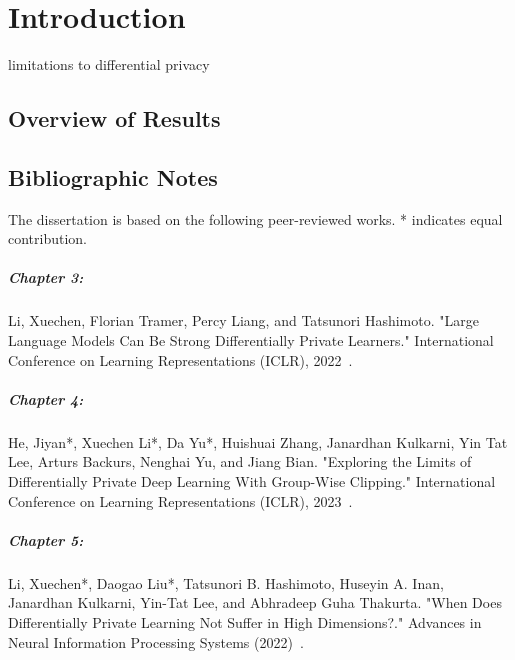 \chapter{Introduction}


limitations to differential privacy

\section{Overview of Results}


\newpage
\section*{Bibliographic Notes}

The dissertation is based on the following peer-reviewed works.
* indicates equal contribution.

\paragraph{Chapter 3:} 
Li, Xuechen, Florian Tramer, Percy Liang, and Tatsunori Hashimoto. "Large Language Models Can Be Strong Differentially Private Learners." International Conference on Learning Representations (ICLR), 2022~\cite{li2021large}.

\paragraph{Chapter 4:}
He, Jiyan*, Xuechen Li*, Da Yu*, Huishuai Zhang, Janardhan Kulkarni, Yin Tat Lee, Arturs Backurs, Nenghai Yu, and Jiang Bian. "Exploring the Limits of Differentially Private Deep Learning With Group-Wise Clipping." International Conference on Learning Representations (ICLR), 2023~\cite{he2022exploring}.

\paragraph{Chapter 5:}
Li, Xuechen*, Daogao Liu*, Tatsunori B. Hashimoto, Huseyin A. Inan, Janardhan Kulkarni, Yin-Tat Lee, and Abhradeep Guha Thakurta. "When Does Differentially Private Learning Not Suffer in High Dimensions?." Advances in Neural Information Processing Systems (2022)~\cite{li2022does}.

